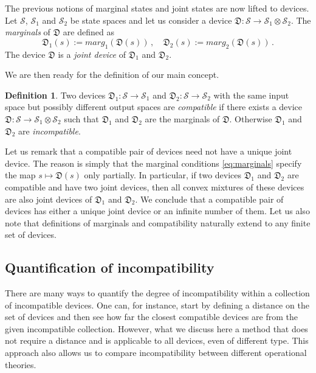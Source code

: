 \documentclass[12pt]{iopart}
\theoremstyle{definition}
\newtheorem*{definition*}{Definition}
\newcommand{\Dev}{\mathfrak{D}} %
\begin{document}
The previous notions of marginal states and joint states are now lifted to devices. 
Let $\mathcal{S}$, $\mathcal{S}_1$ and $\mathcal{S}_2$ be state spaces and let us consider a device $\Dev:\mathcal{S}\to\mathcal{S}_1 \otimes \mathcal{S}_2$.
The \emph{marginals} of $\Dev$ are defined as
\begin{equation}\label{eq:marginals}
\Dev_1(s) := marg_1(\Dev(s)) \, , \quad \Dev_2(s) := marg_2(\Dev(s)) \, .
\end{equation}
The device $\Dev$ is a \emph{joint device} of $\Dev_1$ and $\Dev_2$.

We are then ready for the definition of our main concept.


\begin{definition*}
Two devices $\Dev_1: \mathcal{S} \to \mathcal{S}_1$ and 
$\Dev_2: \mathcal{S} \to \mathcal{S}_2$ with the same input space but possibly different output spaces are \emph{compatible} if there exists a device $\Dev: \mathcal{S} \to \mathcal{S}_1 \otimes \mathcal{S}_2$ such that $\Dev_1$ and $\Dev_2$ are the marginals of $\Dev$.
Otherwise $\Dev_1$ and $\Dev_2$ are \emph{incompatible}.
\end{definition*}

Let us remark that a compatible pair of devices need not have a unique joint device. The reason is simply that the marginal conditions \eqref{eq:marginals} specify the map $s \mapsto  \Dev(s)$ only partially. In particular, if two devices $\Dev_1$ and $\Dev_2$ are compatible and have two joint devices, then all convex mixtures of these  devices are also joint devices of $\Dev_1$ and $\Dev_2$. 
We conclude that a compatible pair of devices has either a unique joint device or an infinite number of them.  Let us also note that definitions of marginals and compatibility naturally extend to any finite set of devices. 

\subsection{Quantification of incompatibility}\label{sec:degree}

There are many ways to quantify the degree of incompatibility within a collection of incompatible devices. 
One can, for instance, start by defining a distance on the set of devices and then see how far the closest compatible devices are from the given incompatible collection.
However, what we discuss here a method that does not require a distance and is applicable to all devices, even of different type. 
This approach also allows us to compare incompatibility between different operational theories.
\end{document}
